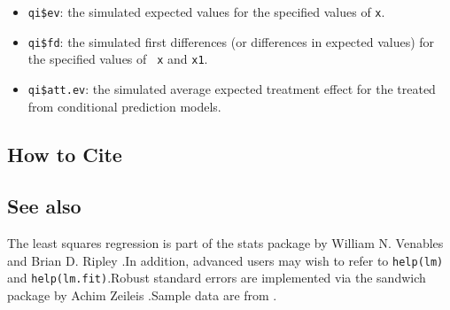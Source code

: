 \begin{itemize}
   \begin{itemize}
   \item {\tt qi\$ev}: the simulated expected values for the specified
     values of {\tt x}.
   \item {\tt qi\$fd}:  the simulated first differences (or
     differences in expected values) for the specified values of {\tt
       x} and {\tt x1}. 
   \item {\tt qi\$att.ev}: the simulated average expected treatment
     effect for the treated from conditional prediction models.  
   \end{itemize}
\end{itemize}

\subsection* {How to Cite} 

\CiteZelig

\subsection* {See also}
The least squares regression is part of the stats package by William N.
Venables and Brian D. Ripley \citep{VenRip02}.In addition, advanced users may wish to refer to \texttt{help(lm)} and \texttt{help(lm.fit)}.Robust standard errors are implemented via the sandwich package by Achim Zeileis \citep{Zeileis04}.Sample data are from \cite{KinTomWit00}.



 

